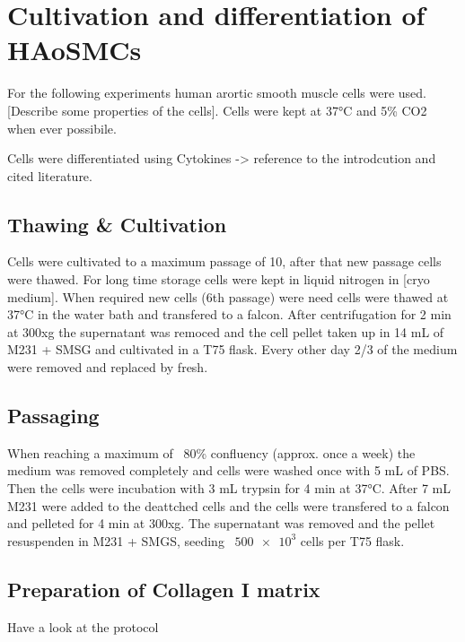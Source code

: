 \section{Cultivation and differentiation of HAoSMCs}
\label{sec:cultivation}
For the following experiments human arortic smooth muscle cells were used. [Describe some properties of the cells]. Cells were kept at 37°C and 5\% CO2 when ever possibile.

Cells were differentiated using Cytokines -> reference to the introdcution and cited literature.

    \subsection{Thawing \& Cultivation}
    Cells were cultivated to a maximum passage of 10, after that new passage cells were thawed. For long time storage cells were kept in liquid nitrogen in [cryo medium]. When required new cells (6th passage) were need cells were thawed at 37°C in the water bath and transfered to a falcon. After centrifugation for 2 min at 300xg the supernatant was remoced and the cell pellet taken up in 14 mL of M231 + SMSG and cultivated in a T75 flask. Every other day 2/3 of the medium were removed and replaced by fresh.

    \subsection{Passaging}
    When reaching a maximum of ~80\% confluency (approx. once a week) the medium was removed completely and cells were washed once with 5 mL of PBS. Then the cells were incubation with 3 mL trypsin for 4 min at 37°C. After 7 mL M231 were added to the deattched cells and the cells were transfered to a falcon and pelleted for 4 min at 300xg. The supernatant was removed and the pellet resuspenden in M231 + SMGS, seeding ~$\num{500e3}$ cells per T75 flask.

    \subsection{Preparation of Collagen I matrix}
    Have a look at the protocol

